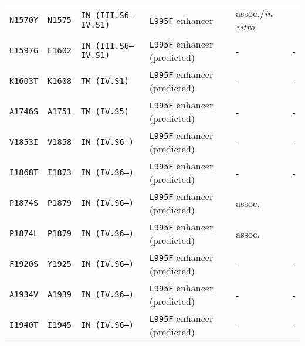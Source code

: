 \begin{tabular}{llllll}
\texttt{N1570Y} & \texttt{N1575} & \texttt{IN (III.S6--IV.S1)} & \texttt{L995F} enhancer & assoc./\emph{in vitro} & \cite{Jones2012,Wang2015} \\

\texttt{E1597G} & \texttt{E1602} & \texttt{IN (III.S6--IV.S1)} & \texttt{L995F} enhancer (predicted) & - & - \\

\texttt{K1603T} & \texttt{K1608} & \texttt{TM (IV.S1)} & \texttt{L995F} enhancer (predicted) & - & - \\

\texttt{A1746S} & \texttt{A1751} & \texttt{TM (IV.S5)} & \texttt{L995F} enhancer (predicted) & - & - \\

\texttt{V1853I} & \texttt{V1858} & \texttt{IN (IV.S6--)} & \texttt{L995F} enhancer (predicted) & - & - \\

\texttt{I1868T} & \texttt{I1873} & \texttt{IN (IV.S6--)} & \texttt{L995F} enhancer (predicted) & - & - \\

\texttt{P1874S} & \texttt{P1879} & \texttt{IN (IV.S6--)} & \texttt{L995F} enhancer (predicted) & assoc. & \cite{Sonoda2008} \\

\texttt{P1874L} & \texttt{P1879} & \texttt{IN (IV.S6--)} & \texttt{L995F} enhancer (predicted) & assoc. & \cite{Sonoda2008} \\

\texttt{F1920S} & \texttt{Y1925} & \texttt{IN (IV.S6--)} & \texttt{L995F} enhancer (predicted) & - & - \\

\texttt{A1934V} & \texttt{A1939} & \texttt{IN (IV.S6--)} & \texttt{L995F} enhancer (predicted) & - & - \\

\texttt{I1940T} & \texttt{I1945} & \texttt{IN (IV.S6--)} & \texttt{L995F} enhancer (predicted) & - & - \\

\bottomrule
\end{tabular}

